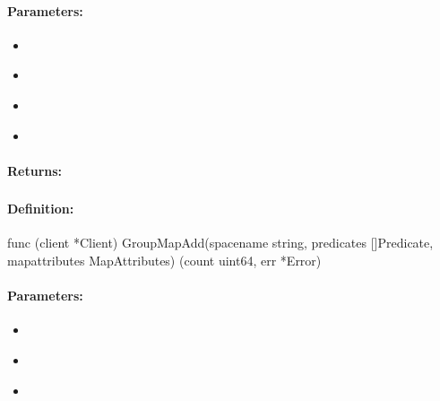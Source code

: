 \paragraph{Parameters:}
\begin{itemize}[noitemsep]
\item {}\\

\item {}\\

\item {}\\

\item {}\\

\end{itemize}

\paragraph{Returns:}


\pagebreak
\subsubsection{}
\label{api:Go:GroupMapAdd}


\paragraph{Definition:}
\begin{gocode}
func (client *Client) GroupMapAdd(spacename string, predicates []Predicate, mapattributes MapAttributes) (count uint64, err *Error)
\end{gocode}

\paragraph{Parameters:}
\begin{itemize}[noitemsep]
\item {}\\

\item {}\\

\item {}\\

\end{itemize}

